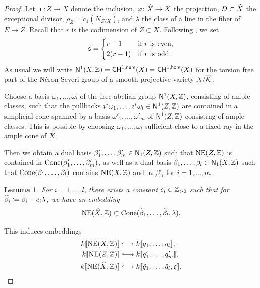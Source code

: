 \documentclass[twoside,leqno]{article}
\numberwithin{equation}{section}
\theoremstyle{plain}
\newtheorem{lemma}[equation]{Lemma}
\theoremstyle{definition}
\begin{document}
\begin{proof}
Let $\imath \colon Z\to X$ denote the inclusion, $\varphi\colon \widehat{X} \to X$ the projection, $D \subset \widehat{X}$ the exceptional divisor, $\rho_Z = c_1(N_{Z/X})$, and $\lambda$ the class of a line in the fiber of $E \to Z$.
Recall that $r$ is the codimension of $Z \subset X$.
Following \cite[(5.11)]{Iritani_blowup}, we set
\[\mathfrak s = \begin{cases}
    r-1 & \text{if $r$ is even,} \\
    2(r-1) & \text{if $r$ is odd.}
\end{cases}\]
As usual we will write $\mathsf{N}^1(X,\mathbb Z) =  \mathsf{CH}^{1,\mathsf{num}}(X) = \mathsf{CH}^{1,\mathsf{hom}}(X)$ for the torsion free part of the N\'{e}ron-Severi group of a smooth projective variety $X/\overline{\mathcal K}$.

Choose a basis $\omega_1, \dots, \omega_l$ of the free abelian group {$\mathsf{N}^1(X, \mathbb Z)$}, consisting of ample classes, such that the pullbacks $\imath^*\omega_1, \dots, \imath^*\omega_l \in \mathsf{N}^1(Z, \mathbb Z)$ are contained in a simplicial cone spanned by a basis $\omega'_1, \dots, \omega'_m$ of $\mathsf{N}^1(Z, \mathbb Z)$ consisting of ample classes.
This is possible by choosing $\omega_1, \dots, \omega_l$ sufficient close to a fixed ray in the ample cone of $X$.

Then we obtain a dual basis $\beta'_1,\dots,\beta'_m \in \mathsf{N}_1(Z, \mathbb Z)$ such that $\operatorname{NE}(Z, \mathbb Z)$ is contained in $\operatorname{Cone}(\beta'_1,\allowbreak \dots,\allowbreak \beta'_m)$,
as well as a dual basis $\beta_1,\dots,\beta_l \in \mathsf{N}_1(X, \mathbb Z)$ such that $\operatorname{Cone}(\beta_1,\dots,\beta_l)$ contains $\operatorname{NE}(X, \mathbb Z)$ and $\imath_* \beta'_i$ for $i=1,\dots,m$.


\begin{lemma}
  For $i = 1, \dots, l$, there exists a constant $c_i \in \mathbb Z_{>0}$ such that for $\widetilde\beta_i \coloneqq \beta_i - c_i \lambda$, we have an embedding
  \[ \operatorname{NE}(\widehat{X}, \mathbb Z) \subset \operatorname{Cone}(\widetilde\beta_1,\dots,\widetilde\beta_l,\lambda). \]
\end{lemma}


This induces embeddings
\begin{align*}
  k\dbb{\NE(X, \bbZ)} & \hooklongrightarrow k\dbb{q_1,\dots,q_l}, \\
  k\dbb{\NE(Z, \bbZ)} & \hooklongrightarrow k\dbb{q'_1,\dots,q'_m}, \\
  k\dbb{\NE(\tX, \bbZ)} & \hooklongrightarrow k\dbb{\tq_1,\dots,\tq_l,\fq}.
\end{align*}


\end{proof}
\end{document}
